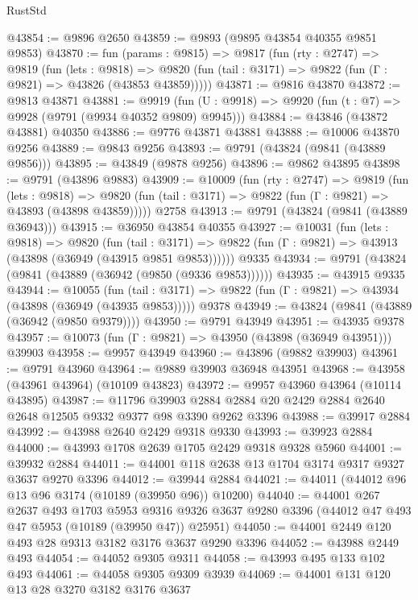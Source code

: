 \begin{lexlean}{RustStd}
\begin{coremodule}
@43854 := @9896 @2650
@43859 := @9893 (@9895 @43854 @40355 @9851 @9853)
@43870 := fun (params : @9815) =>
  @9817
    (fun (rty : @2747) =>
    @9819
      (fun (lets : @9818) =>
      @9820 (fun (tail : @3171) => @9822 (fun (Γ : @9821) => @43826 (@43853 @43859)))))
@43871 := @9816 @43870
@43872 := @9813 @43871
@43881 := @9919
    (fun (U : @9918) => @9920 (fun (t : @7) => @9928 (@9791 (@9934 @40352 @9809) @9945)))
@43884 := @43846 (@43872 @43881) @40350
@43886 := @9776 @43871 @43881
@43888 := @10006 @43870 @9256
@43889 := @9843 @9256
@43893 := @9791 (@43824 (@9841 (@43889 @9856)))
@43895 := @43849 (@9878 @9256)
@43896 := @9862 @43895
@43898 := @9791 (@43896 @9883)
@43909 := @10009
    (fun (rty : @2747) =>
    @9819
      (fun (lets : @9818) =>
      @9820 (fun (tail : @3171) => @9822 (fun (Γ : @9821) => @43893 (@43898 @43859)))))
    @2758
@43913 := @9791 (@43824 (@9841 (@43889 @36943)))
@43915 := @36950 @43854 @40355
@43927 := @10031
    (fun (lets : @9818) =>
    @9820
      (fun (tail : @3171) =>
      @9822 (fun (Γ : @9821) => @43913 (@43898 (@36949 (@43915 @9851 @9853))))))
    @9335
@43934 := @9791 (@43824 (@9841 (@43889 (@36942 (@9850 (@9336 @9853))))))
@43935 := @43915 @9335
@43944 := @10055
    (fun (tail : @3171) => @9822 (fun (Γ : @9821) => @43934 (@43898 (@36949 (@43935 @9853)))))
    @9378
@43949 := @43824 (@9841 (@43889 (@36942 (@9850 @9379))))
@43950 := @9791 @43949
@43951 := @43935 @9378
@43957 := @10073 (fun (Γ : @9821) => @43950 (@43898 (@36949 @43951))) @39903
@43958 := @9957 @43949
@43960 := @43896 (@9882 @39903)
@43961 := @9791 @43960
@43964 := @9889 @39903 @36948 @43951
@43968 := @43958 (@43961 @43964) (@10109 @43823)
@43972 := @9957 @43960 @43964 (@10114 @43895)
@43987 := @11796
    @39903
    @2884
    @2884
    @20
    @2429
    @2884
    @2640
    @2648
    @12505
    @9332
    @9377
    @98
    @3390
    @9262
    @3396
@43988 := @39917 @2884
@43992 := @43988 @2640 @2429 @9318 @9330
@43993 := @39923 @2884
@44000 := @43993 @1708 @2639 @1705 @2429 @9318 @9328 @5960
@44001 := @39932 @2884
@44011 := @44001 @118 @2638 @13 @1704 @3174 @9317 @9327 @3637 @9270 @3396
@44012 := @39944 @2884
@44021 := @44011 (@44012 @96 @13 @96 @3174 (@10189 (@39950 @96)) @10200)
@44040 := @44001
    @267
    @2637
    @493
    @1703
    @5953
    @9316
    @9326
    @3637
    @9280
    @3396
    (@44012 @47 @493 @47 @5953 (@10189 (@39950 @47)) @25951)
@44050 := @44001 @2449 @120 @493 @28 @9313 @3182 @3176 @3637 @9290 @3396
@44052 := @43988 @2449 @493
@44054 := @44052 @9305 @9311
@44058 := @43993 @495 @133 @102 @493
@44061 := @44058 @9305 @9309 @3939
@44069 := @44001 @131 @120 @13 @28 @3270 @3182 @3176 @3637

\end{coremodule}
\end{lexlean}
